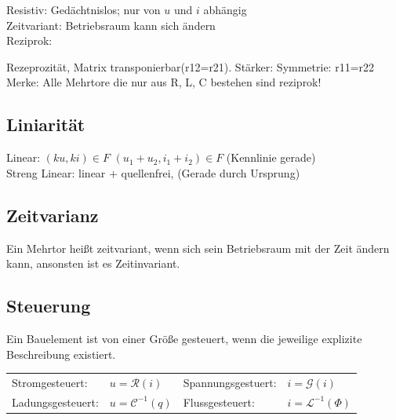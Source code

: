 \documentclass[fs, footer]{latex4ei}
\begin{document}
\begin{multicols*}{4}
	Resistiv: Gedächtnislos; nur von $u$ und $i$ abhängig\\
	Zeitvariant: Betriebsraum kann sich ändern\\
	Reziprok: 

	Rezeprozität, Matrix transponierbar(r12=r21). Stärker: Symmetrie: r11=r22
	Merke: Alle Mehrtore die nur aus R, L, C bestehen sind reziprok!

 
	\subsection{Liniarität}
	Linear: $(ku, ki) \in F$ \quad $(u_1 + u_2, i_1 + i_2) \in F$ (Kennlinie gerade) \\
	Streng Linear: linear + quellenfrei, (Gerade durch Ursprung)\\

	\subsection{Zeitvarianz}
	Ein Mehrtor heißt zeitvariant, wenn sich sein Betriebsraum mit der Zeit ändern kann, ansonsten
	ist es Zeitinvariant.

	\subsection{Steuerung}
	Ein Bauelement ist von einer Größe gesteuert, wenn die jeweilige explizite Beschreibung existiert.\\
	\begin{tabular*}{\columnwidth}{@{\extracolsep\fill}llll@{}}
		Stromgesteuert: & $u=\mathcal R(i)$ & Spannungsgestuert: & $i=\mathcal G(i)$\\
		Ladungsgesteuert: & $u=\mathcal C^{-1}(q)$ & Flussgesteuert: & $i=\mathcal L^{-1}(\Phi)$
	\end{tabular*}


\end{multicols*}
\end{document}
